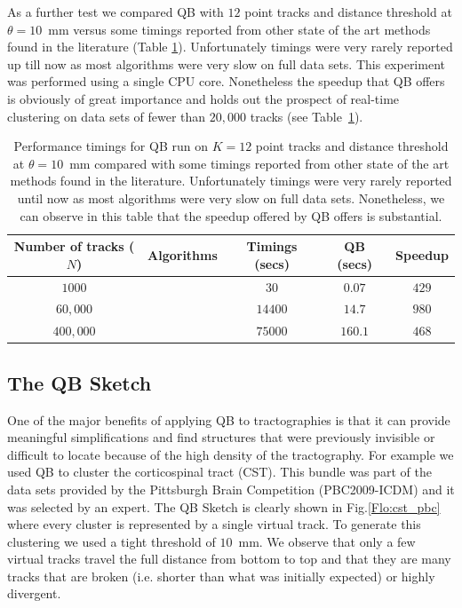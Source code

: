 \documentclass[preprint,authoryear,a4paper,10pt,onecolumn]{elsarticle}
\begin{document}
As a further test we compared QB with $12$ point tracks and distance
threshold at $\theta=10$~mm versus some timings reported from other
state of the art methods found in the literature (Table
\ref{Flo:timings}). Unfortunately timings were very rarely reported up
till now as most algorithms were very slow on full data sets. This
experiment was performed using a single CPU core. Nonetheless the
speedup that QB offers is obviously of great importance and holds out
the prospect of real-time clustering on data sets of fewer than $20,000$
tracks (see Table~\ref{Flo:timings}).

%
\begin{table}
\small\addtolength{\tabcolsep}{-5pt}

\begin{centering}
\begin{tabular}{ccccc}
\hline 
\hline
Number of tracks ($N$) & Algorithms & Timings (secs) & QB (secs) & Speedup\tabularnewline
\hline
$1000$ & \citet{wang2010tractography} & $30$ & $0.07$ & $429$\tabularnewline
$60,000$ & \citet{wang2010tractography} & $14400$ & $14.7$ & $980$\tabularnewline
$400,000$ & \citet{Visser2010} & $75000$ & $160.1$ & $468$\tabularnewline
\hline
\end{tabular}
\par\end{centering}
\caption{Performance timings for QB run on $K=12$ point tracks and
  distance threshold at $\theta=10$~mm compared with some timings
  reported from other state of the art methods found in the
  literature. Unfortunately timings were very rarely reported until now
  as most algorithms were very slow on full data sets. Nonetheless, we
  can observe in this table that the speedup offered by QB offers is
  substantial.\label{Flo:timings}}
\end{table}

\subsection{The QB Sketch}

One of the major benefits of applying QB to tractographies is that it
can provide meaningful simplifications and find structures that were
previously invisible or difficult to locate because of the high density
of the tractography. For example we used QB to cluster the corticospinal
tract (CST). This bundle was part of the data sets provided by the
Pittsburgh Brain Competition (PBC2009-ICDM) and it was selected by an
expert. The QB Sketch is clearly shown in Fig.\ref{Flo:cst_pbc} where
every cluster is represented by a single virtual track. To generate this
clustering we used a tight threshold of $10$~mm. We observe that only a
few virtual tracks travel the full distance from bottom to top and that
they are many tracks that are broken (i.e. shorter than what was
initially expected) or highly divergent.
\end{document}
